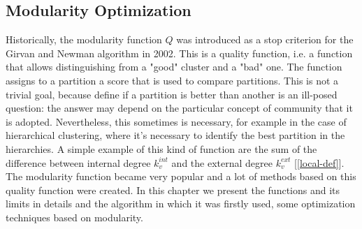 \subsection{Modularity Optimization}
Historically, the modularity function $Q$ was introduced as a stop criterion for the Girvan and Newman algorithm in 2002. This is a quality function, i.e. a function that allows distinguishing from a "good" cluster and a "bad" one. The function assigns to a partition a score that is used to compare partitions. This is not a trivial goal, because define if a partition is better than another is an ill-posed question: the answer may depend on the particular concept of community that it is adopted. Nevertheless, this sometimes is necessary, for example in the case of hierarchical clustering, where it's necessary to identify the best partition in the hierarchies. A simple example of this kind of function are the sum of the difference between internal degree $k_v^{int}$ and the external degree $k_v^{ext}$ [\ref{local-def}]. \\
The modularity function became very popular and a lot of methods based on this quality function were created.
In this chapter we present the functions and its limits in details and the algorithm in which it was firstly used, some optimization techniques based on modularity.
